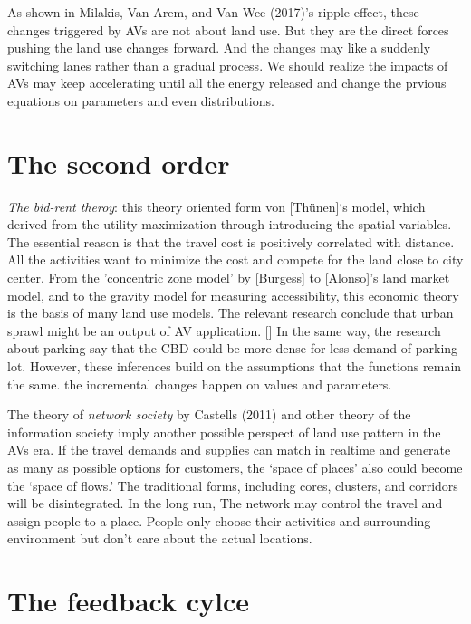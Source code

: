 \documentclass[12pt,]{article}
\begin{document}
As shown in Milakis, Van Arem, and Van Wee (2017)'s ripple effect, these
changes triggered by AVs are not about land use. But they are the direct
forces pushing the land use changes forward. And the changes may like a
suddenly switching lanes rather than a gradual process. We should
realize the impacts of AVs may keep accelerating until all the energy
released and change the prvious equations on parameters and even
distributions.

\hypertarget{the-second-order}{%
\section{The second order}\label{the-second-order}}

\emph{The bid-rent theroy}: this theory oriented form von {[}Thünen{]}`s
model, which derived from the utility maximization through introducing
the spatial variables. The essential reason is that the travel cost is
positively correlated with distance. All the activities want to minimize
the cost and compete for the land close to city center. From the
'concentric zone model' by {[}Burgess{]} to {[}Alonso{]}'s land market
model, and to the gravity model for measuring accessibility, this
economic theory is the basis of many land use models. The relevant
research conclude that urban sprawl might be an output of AV
application. {[}{]} In the same way, the research about parking say that
the CBD could be more dense for less demand of parking lot. However,
these inferences build on the assumptions that the functions remain the
same. the incremental changes happen on values and parameters.

The theory of \emph{network society} by Castells (2011) and other theory
of the information society imply another possible perspect of land use
pattern in the AVs era. If the travel demands and supplies can match in
realtime and generate as many as possible options for customers, the
`space of places' also could become the `space of flows.' The
traditional forms, including cores, clusters, and corridors will be
disintegrated. In the long run, The network may control the travel and
assign people to a place. People only choose their activities and
surrounding environment but don't care about the actual locations.

\hypertarget{the-feedback-cylce}{%
\section{The feedback cylce}\label{the-feedback-cylce}}
\end{document}
